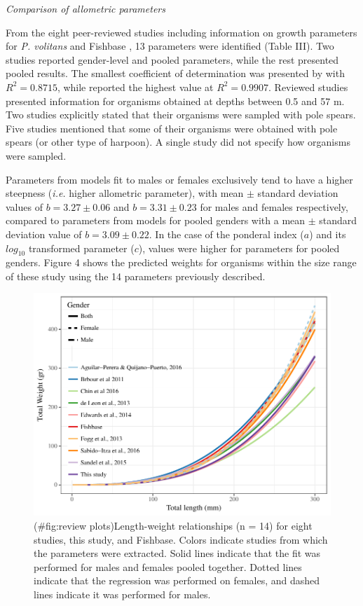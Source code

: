 \documentclass[fleqn,10pt,lineno]{wlpeerj} %
\theoremstyle{definition}
\theoremstyle{definition}
\theoremstyle{definition}
\theoremstyle{remark}
\begin{document}
\emph{Comparison of allometric parameters}

From the eight peer-reviewed studies including information on growth
parameters for \emph{P. volitans} and Fishbase
\citep{froese_website_2016}, 13 parameters were identified (Table III).
Two studies \citep{aguilarperera_2016,fogg_2013} reported gender-level
and pooled parameters, while the rest presented pooled results. The
smallest coefficient of determination was presented by \citet{chin_2016}
with \(R^2 = 0.8715\), while \citet{sabidoitza_2016} reported the
highest value at \(R^2 = 0.9907\). Reviewed studies presented
information for organisms obtained at depths between 0.5 and 57 m. Two
studies \citep{aguilarperera_2016,chin_2016} explicitly stated that
their organisms were sampled with pole spears. Five studies
\citep{sandel_2015,barbour_2011,fogg_2013,edwards_2014,sabidoitza_2016}
mentioned that some of their organisms were obtained with pole spears
(or other type of harpoon). A single study \citep{deleon_2013} did not
specify how organisms were sampled.

Parameters from models fit to males or females exclusively tend to have
a higher steepness (\emph{i.e.} higher allometric parameter), with mean
\(\pm\) standard deviation values of \(b = 3.27 \pm 0.06\) and
\(b = 3.31 \pm 0.23\) for males and females respectively, compared to
parameters from models for pooled genders with a mean \(\pm\) standard
deviation value of \(b = 3.09 \pm 0.22\). In the case of the ponderal
index (\(a\)) and its \(log_{10}\) transformed parameter (\(c\)), values
were higher for parameters for pooled genders. Figure 4 shows the
predicted weights for organisms within the size range of these study
using the 14 parameters previously described.

\begin{figure}
\centering
\includegraphics{Manuscript_files/figure-latex/review plots-1.pdf}
\caption{(\#fig:review plots)Length-weight relationships (n = 14) for
eight studies, this study, and Fishbase. Colors indicate studies from
which the parameters were extracted. Solid lines indicate that the fit
was performed for males and females pooled together. Dotted lines
indicate that the regression was performed on females, and dashed lines
indicate it was performed for males.}
\end{figure}
\end{document}
